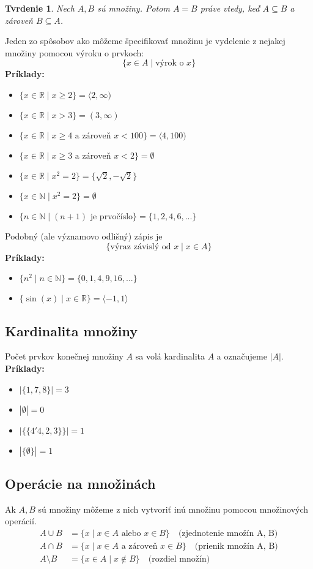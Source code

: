 \documentclass[12pt, a4paper]{article}
\theoremstyle{definition}
\theoremstyle{plain}
\newtheorem{theorem}[definition]{Tvrdenie}
\theoremstyle{remark}
\begin{document}
\begin{theorem}
Nech $A, B$ sú množiny. Potom $A=B$ práve vtedy, keď $A \subseteq B$ a zároveň $B \subseteq A$.
\end{theorem}

Jeden zo spôsobov ako môžeme špecifikovať množinu je vydelenie z nejakej množiny pomocou výroku o prvkoch:
$$ \{x \in A \mid \text{výrok o } x\} $$
\textbf{Príklady:}
\begin{itemize}
    \item $\{x \in \mathbb{R} \mid x \ge 2\} = \langle 2, \infty)$
    \item $\{x \in \mathbb{R} \mid x > 3\} = (3, \infty)$
    \item $\{x \in \mathbb{R} \mid x \ge 4 \text{ a zároveň } x < 100\} = \langle 4, 100)$
    \item $\{x \in \mathbb{R} \mid x \ge 3 \text{ a zároveň } x < 2\} = \emptyset$
    \item $\{x \in \mathbb{R} \mid x^2 = 2\} = \{\sqrt{2}, -\sqrt{2}\}$
    \item $\{x \in \mathbb{N} \mid x^2 = 2\} = \emptyset$
    \item $\{n \in \mathbb{N} \mid (n+1) \text{ je prvočíslo}\} = \{1, 2, 4, 6, ...\}$
\end{itemize}

Podobný (ale významovo odlišný) zápis je
$$ \{ \text{výraz závislý od } x \mid x \in A \} $$
\textbf{Príklady:}
\begin{itemize}
    \item $\{n^2 \mid n \in \mathbb{N}\} = \{0, 1, 4, 9, 16, ...\}$
    \item $\{\sin(x) \mid x \in \mathbb{R}\} = \langle -1, 1 \rangle$
\end{itemize}

\subsection*{Kardinalita množiny}
Počet prvkov konečnej množiny $A$ sa volá kardinalita $A$ a označujeme $|A|$.
\noindent\textbf{Príklady:}
\begin{itemize}
    \item $|\{1,7,8\}|=3$
    \item $|\emptyset|=0$
    \item $|\{\{4'4,2,3\}\}| = 1$
    \item $|\{\emptyset\}|=1$
\end{itemize}

\subsection*{Operácie na množinách}
Ak $A, B$ sú množiny môžeme z nich vytvoriť inú množinu pomocou množinových operácií.
\begin{align*}
    A \cup B &= \{x \mid x \in A \text{ alebo } x \in B\} \quad \text{(zjednotenie množín A, B)} \\
    A \cap B &= \{x \mid x \in A \text{ a zároveň } x \in B\} \quad \text{(prienik množín A, B)} \\
    A \setminus B &= \{x \in A \mid x \notin B\} \quad \text{(rozdiel množín)}
\end{align*}
\end{document}
